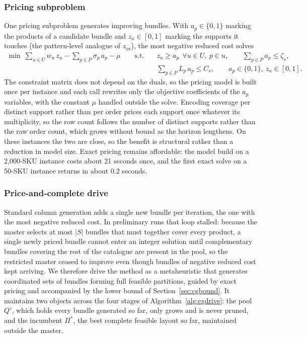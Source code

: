 \documentclass[]{interact}
\begin{document}
\subsubsection{Pricing subproblem}\label{sec:cgpricing}
One pricing subproblem generates improving bundles. With $a_p \in \{0,1\}$ marking the products of a candidate bundle and $z_u \in [0,1]$ marking the supports it touches (the pattern-level analogue of $z_{os}$), the most negative reduced cost solves
\[
\begin{aligned}
\min\ \sum_{u \in U} w_u\, z_u - \sum_{p \in P} \sigma_p\, a_p - \mu
\qquad \text{s.t.} \quad & z_u \ge a_p\ \ \forall u \in U,\ p \in u, \qquad \sum_{p \in P} a_p \le \zeta_s, \\
& \sum_{p \in P} L_p\, a_p \le C_s, \qquad a_p \in \{0,1\},\ z_u \in [0,1].
\end{aligned}
\]
The constraint matrix does not depend on the duals, so the pricing model is built once per instance and each call rewrites only the objective coefficients of the $a_p$ variables, with the constant $\mu$ handled outside the solve. Encoding coverage per distinct support rather than per order prices each support once whatever its multiplicity, so the row count follows the number of distinct supports rather than the raw order count, which grows without bound as the horizon lengthens. On these instances the two are close, so the benefit is structural rather than a reduction in model size. Exact pricing remains affordable: the model build on a 2,000-SKU instance costs about 21 seconds once, and the first exact solve on a 50-SKU instance returns in about 0.2 seconds.

\subsubsection{Price-and-complete drive}\label{sec:cgdrive}
Standard column generation adds a single new bundle per iteration, the one with the most negative reduced cost. In preliminary runs that loop stalled: because the master selects at most $|S|$ bundles that must together cover every product, a single newly priced bundle cannot enter an integer solution until complementary bundles covering the rest of the catalogue are present in the pool, so the restricted master ceased to improve even though bundles of negative reduced cost kept arriving. We therefore drive the method as a metaheuristic that generates coordinated sets of bundles forming full feasible partitions, guided by exact pricing and accompanied by the lower bound of Section~\ref{sec:cgbound}. It maintains two objects across the four stages of Algorithm~\ref{alg:cgdrive}: the pool $Q'$, which holds every bundle generated so far, only grows and is never pruned, and the incumbent $\Pi^{\ast}$, the best complete feasible layout so far, maintained outside the master.
\end{document}

